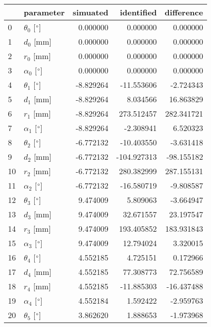 \documentclass{standalone}%
\begin{document}
%
\normalsize%
\begin{tabular}{llrrr}
\toprule
{} &                 parameter &  simuated &  identified &  difference \\
\midrule
0  &  $\theta_{0}$ [$\degree$] &  0.000000 &    0.000000 &    0.000000 \\
1  &              $d_{0}$ [mm] &  0.000000 &    0.000000 &    0.000000 \\
2  &              $r_{0}$ [mm] &  0.000000 &    0.000000 &    0.000000 \\
3  &  $\alpha_{0}$ [$\degree$] &  0.000000 &    0.000000 &    0.000000 \\
4  &  $\theta_{1}$ [$\degree$] & -8.829264 &  -11.553606 &   -2.724343 \\
5  &              $d_{1}$ [mm] & -8.829264 &    8.034566 &   16.863829 \\
6  &              $r_{1}$ [mm] & -8.829264 &  273.512457 &  282.341721 \\
7  &  $\alpha_{1}$ [$\degree$] & -8.829264 &   -2.308941 &    6.520323 \\
8  &  $\theta_{2}$ [$\degree$] & -6.772132 &  -10.403550 &   -3.631418 \\
9  &              $d_{2}$ [mm] & -6.772132 & -104.927313 &  -98.155182 \\
10 &              $r_{2}$ [mm] & -6.772132 &  280.382999 &  287.155131 \\
11 &  $\alpha_{2}$ [$\degree$] & -6.772132 &  -16.580719 &   -9.808587 \\
12 &  $\theta_{3}$ [$\degree$] &  9.474009 &    5.809063 &   -3.664947 \\
13 &              $d_{3}$ [mm] &  9.474009 &   32.671557 &   23.197547 \\
14 &              $r_{3}$ [mm] &  9.474009 &  193.405852 &  183.931843 \\
15 &  $\alpha_{3}$ [$\degree$] &  9.474009 &   12.794024 &    3.320015 \\
16 &  $\theta_{4}$ [$\degree$] &  4.552185 &    4.725151 &    0.172966 \\
17 &              $d_{4}$ [mm] &  4.552185 &   77.308773 &   72.756589 \\
18 &              $r_{4}$ [mm] &  4.552185 &  -11.885303 &  -16.437488 \\
19 &  $\alpha_{4}$ [$\degree$] &  4.552184 &    1.592422 &   -2.959763 \\
20 &  $\theta_{5}$ [$\degree$] &  3.862620 &    1.888653 &   -1.973968 \\

\end{tabular}
\end{document}

